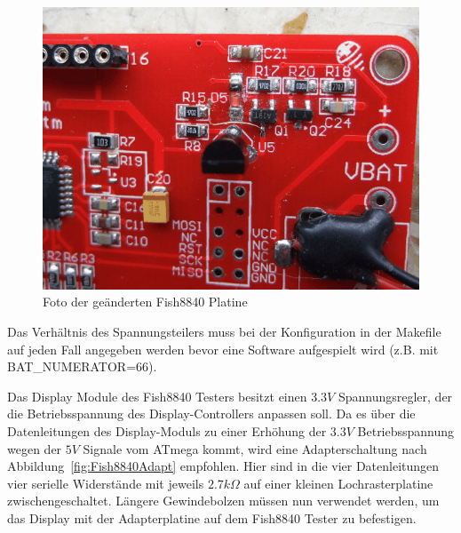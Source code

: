 \begin{figure}[H]
\centering
\includegraphics[width=.7\textwidth]{../PNG/Fish8840patch.jpg}	%
\caption{Foto der geänderten Fish8840 Platine}
\label{fig:Fish8840patch}
\end{figure}

Das Verhältnis des Spannungsteilers muss bei der Konfiguration in der Makefile auf jeden Fall angegeben
werden bevor eine Software aufgespielt wird (z.B. mit BAT\_NUMERATOR=66).

Das Display Module des Fish8840 Testers besitzt einen \(3.3V\) Spannungsregler, der die Betriebsspannung
des Display-Controllers anpassen soll.
Da es über die Datenleitungen des Display-Moduls zu einer Erhöhung der \(3.3V\) Betriebsspannung wegen
der \(5V\) Signale vom ATmega kommt,
wird eine Adapterschaltung nach Abbildung~\ref{fig:Fish8840Adapt} empfohlen. Hier sind in die vier
Datenleitungen vier serielle Widerstände mit jeweils \(2.7k\Omega\) auf einer kleinen Lochrasterplatine
zwischengeschaltet.
Längere Gewindebolzen müssen nun verwendet werden, um das Display mit der Adapterplatine auf dem
Fish8840 Tester zu befestigen.

